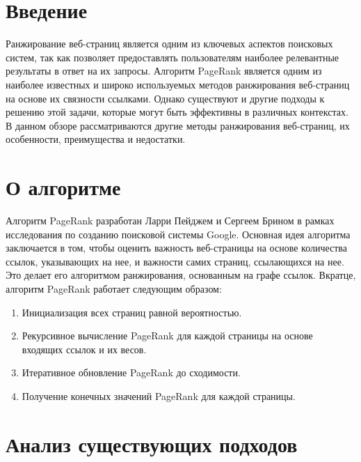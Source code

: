\documentclass[a4paper]{article}
\begin{document}
	\thispagestyle{empty}
	
	
		
	\newpage
		
	\tableofcontents
	
	\pagestyle{plain}
	
	\newpage
	
	\section{Введение}
	
	Ранжирование веб-страниц является одним из ключевых аспектов поисковых систем, так как позволяет предоставлять пользователям наиболее релевантные результаты в ответ на их запросы. Алгоритм PageRank является одним из наиболее известных и широко используемых методов ранжирования веб-страниц на основе их связности ссылками. Однако существуют и другие подходы к решению этой задачи, которые могут быть эффективны в различных контекстах. В данном обзоре рассматриваются другие методы ранжирования веб-страниц, их особенности, преимущества и недостатки.
	
	\section{О алгоритме}
	Алгоритм PageRank разработан Ларри Пейджем и Сергеем Брином в рамках исследования по созданию поисковой системы Google. Основная идея алгоритма заключается в том, чтобы оценить важность веб-страницы на основе количества ссылок, указывающих на нее, и важности самих страниц, ссылающихся на нее. Это делает его алгоритмом ранжирования, основанным на графе ссылок. Вкратце, алгоритм PageRank работает следующим образом:
	
	\begin{enumerate}
		\item Инициализация всех страниц равной вероятностью.
		\item Рекурсивное вычисление PageRank для каждой страницы на основе входящих ссылок и их весов.
		\item Итеративное обновление PageRank до сходимости.
		\item Получение конечных значений PageRank для каждой страницы.
	\end{enumerate}
	
	\section{Анализ существующих подходов}
	
\end{document}
